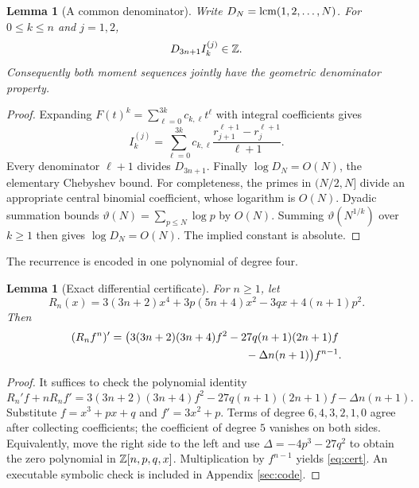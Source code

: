 \documentclass[11pt,a4paper]{article}
\newtheorem{lemma}[theorem]{Lemma}
\theoremstyle{definition}\newtheorem{definition}[theorem]{Definition}
\theoremstyle{remark}\newtheorem{remark}[theorem]{Remark}
\begin{document}
\begin{lemma}[A common denominator]\label{lem:lcm}
Write $D_N=\operatorname{lcm}(1,2,\ldots,N)$. For $0\le k\le n$ and $j=1,2$,
\[
 D_{3n+1}I_k^{(j)}\in\mathbb Z.
\]
Consequently both moment sequences jointly have the geometric denominator property.
\end{lemma}
\begin{proof}
Expanding $F(t)^k=\sum_{\ell=0}^{3k}c_{k,\ell}t^\ell$ with integral coefficients gives
\[
 I_k^{(j)}=\sum_{\ell=0}^{3k}
 c_{k,\ell}\frac{r_{j+1}^{\ell+1}-r_j^{\ell+1}}{\ell+1}.
\]
Every denominator $\ell+1$ divides $D_{3n+1}$. Finally $\log D_N=O(N)$, the elementary Chebyshev bound. For completeness, the primes in $(N/2,N]$ divide an appropriate central binomial coefficient, whose logarithm is $O(N)$. Dyadic summation bounds $\vartheta(N)=\sum_{p\le N}\log p$ by $O(N)$. Summing $\vartheta(N^{1/k})$ over $k\ge1$ then gives $\log D_N=O(N)$. The implied constant is absolute.
\end{proof}

The recurrence is encoded in one polynomial of degree four.
\begin{lemma}[Exact differential certificate]\label{lem:certificate}
For $n\ge1$, let
\[
 R_n(x)=3(3n+2)x^4+3p(5n+4)x^2-3qx+4(n+1)p^2.
\]
Then
\begin{align}\label{eq:cert}
 (R_nf^n)'={}&\bigl(3(3n+2)(3n+4)f^2
 -27q(n+1)(2n+1)f\notag\\
 &\hspace{38mm}-\Delta n(n+1)\bigr)f^{n-1}.
\end{align}
\end{lemma}
\begin{proof}
It suffices to check the polynomial identity
\[
 R_n'f+nR_nf'
 =3(3n+2)(3n+4)f^2-27q(n+1)(2n+1)f-\Delta n(n+1).
\]
Substitute $f=x^3+px+q$ and $f'=3x^2+p$. Terms of degree $6,4,3,2,1,0$ agree after collecting coefficients; the coefficient of degree $5$ vanishes on both sides. Equivalently, move the right side to the left and use $\Delta=-4p^3-27q^2$ to obtain the zero polynomial in $\mathbb Z[n,p,q,x]$. Multiplication by $f^{n-1}$ yields \eqref{eq:cert}. An executable symbolic check is included in Appendix \ref{sec:code}.
\end{proof}
\end{document}
